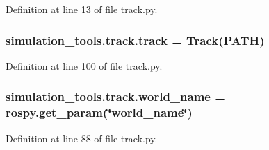 Definition at line 13 of file track.\+py.

\subsubsection[{\texorpdfstring{track}{track}}]{\setlength{\rightskip}{0pt plus 5cm}simulation\+\_\+tools.\+track.\+track = {\bf Track}(P\+A\+TH)}\hypertarget{namespacesimulation__tools_1_1track_ac731095c2502c445d46302406cb81651}{}\label{namespacesimulation__tools_1_1track_ac731095c2502c445d46302406cb81651}


Definition at line 100 of file track.\+py.

\subsubsection[{\texorpdfstring{world\+\_\+name}{world_name}}]{\setlength{\rightskip}{0pt plus 5cm}simulation\+\_\+tools.\+track.\+world\+\_\+name = rospy.\+get\+\_\+param(\char`\"{}world\+\_\+name\char`\"{})}\hypertarget{namespacesimulation__tools_1_1track_ab4fe6910a622507d50763ab0aeb7d990}{}\label{namespacesimulation__tools_1_1track_ab4fe6910a622507d50763ab0aeb7d990}


Definition at line 88 of file track.\+py.

